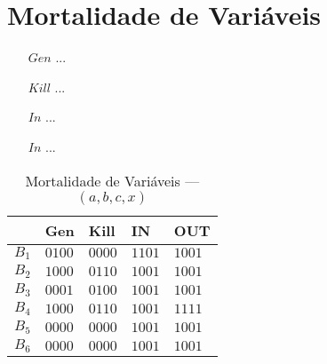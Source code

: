 \section{Mortalidade de Vari\'aveis}

\begin{itemize}
  \item[$Gen$] ...
  \item[$Kill$] ...
  \item[$In$] ...
  \item[$In$] ...
\end{itemize}

\begin{table}[ht]
\centering
\begin{tabular}{l|l|l|l|l}
	& Gen & Kill & IN & OUT\\
\hline
$B_{1}$ &  $0100$ & $0000$ & $1101$ & $1001$\\
$B_{2}$ &  $1000$ & $0110$ & $1001$ & $1001$\\
$B_{3}$ &  $0001$ & $0100$ & $1001$ & $1001$\\
$B_{4}$ &  $1000$ & $0110$ & $1001$ & $1111$\\
$B_{5}$ &  $0000$ & $0000$ & $1001$ & $1001$\\
$B_{6}$ &  $0000$ & $0000$ & $1001$ & $1001$\\
\end{tabular}
\caption{Mortalidade de Vari\'aveis --- $(a, b, c, x)$}
\end{table}

